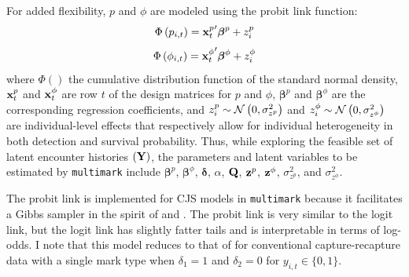 \documentclass[12pt]{article}
\begin{document}
For added flexibility, $p$ and $\phi$ are modeled using the probit link function:
\begin{equation*}
  \Phi \left( p_{i,t} \right) = {{\bf x}^p_t}^\prime \boldsymbol{\beta}^p + z^p_i
\end{equation*}
\begin{equation*}
  \Phi \left( \phi_{i,t} \right) = {{\bf x}^\phi_t}^\prime \boldsymbol{\beta}^\phi + z^\phi_i
\end{equation*}
where $\Phi()$ the cumulative distribution function of the standard normal density, ${\bf x}^p_t$ and ${\bf x}^\phi_t$ are row $t$ of the design matrices for $p$ and $\phi$, $\boldsymbol{\beta}^p$ and $\boldsymbol{\beta}^\phi$ are the corresponding regression coefficients, and $z^p_i \sim {\cal N} \left( 0,\sigma^2_{z^p} \right)$ and $z^\phi_i \sim {\cal N} \left( 0,\sigma^2_{z^\phi} \right)$ are individual-level effects that respectively allow for individual heterogeneity in both detection and survival probability. Thus, while exploring the feasible set of latent encounter histories $({\bf Y})$, the parameters and latent variables to be estimated by \verb|multimark| include ${\boldsymbol \beta}^p$, ${\boldsymbol\beta}^\phi$, ${\boldsymbol \delta}$, $\alpha$, ${\bf Q}$, ${\bf z}^p$, ${\bf z}^\phi$, $\sigma^2_{z^p}$, and $\sigma^2_{z^\phi}$. 

The probit link is implemented for CJS models in \verb|multimark| because it facilitates a Gibbs sampler in the spirit of \cite{Albert&Chib1993} and \cite{LaakeEtAl2013}.  The probit link is very similar to the logit link, but the logit link has slightly fatter tails and is interpretable in terms of log-odds. I note that this model reduces to that of \cite{LaakeEtAl2013} for conventional capture-recapture data with a single mark type when $\delta_1=1$ and $\delta_2=0$ for $y_{i,t} \in \{0,1\}$.
\end{document}
